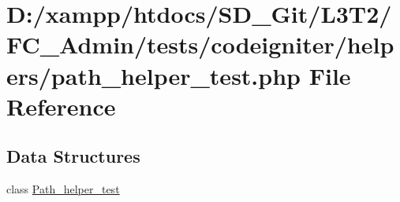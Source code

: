 \hypertarget{_admin_2tests_2codeigniter_2helpers_2path__helper__test_8php}{}\section{D\+:/xampp/htdocs/\+S\+D\+\_\+\+Git/\+L3\+T2/\+F\+C\+\_\+\+Admin/tests/codeigniter/helpers/path\+\_\+helper\+\_\+test.php File Reference}
\label{_admin_2tests_2codeigniter_2helpers_2path__helper__test_8php}
\subsection*{Data Structures}
\begin{DoxyCompactItemize}
\item 
class \hyperlink{class_path__helper__test}{Path\+\_\+helper\+\_\+test}
\end{DoxyCompactItemize}
